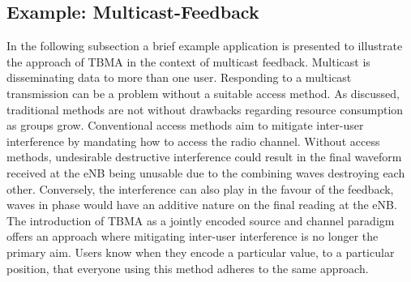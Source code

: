 \documentclass{article}
\begin{document}
\subsection{Example: Multicast-Feedback}\label{example_multicast_feedback}

In the following subsection a brief example application is presented to illustrate the approach of \ac{TBMA} in the context of multicast feedback. Multicast is disseminating data to more than one user. Responding to a multicast transmission can be a problem without a suitable access method. As discussed, traditional methods are not without drawbacks regarding resource consumption as groups grow. Conventional access methods aim to mitigate inter-user interference by mandating how to access the radio channel. Without access methods, undesirable destructive interference could result in the final waveform received at the eNB being unusable due to the combining waves destroying each other. Conversely, the interference can also play in the favour of the feedback, waves in phase would have an additive nature on the final reading at the eNB. The introduction of \ac{TBMA} as a jointly encoded source and channel paradigm offers an approach where mitigating inter-user interference is no longer the primary aim. Users know when they encode a particular value, to a particular position, that everyone using this method adheres to the same approach. 
\end{document}
